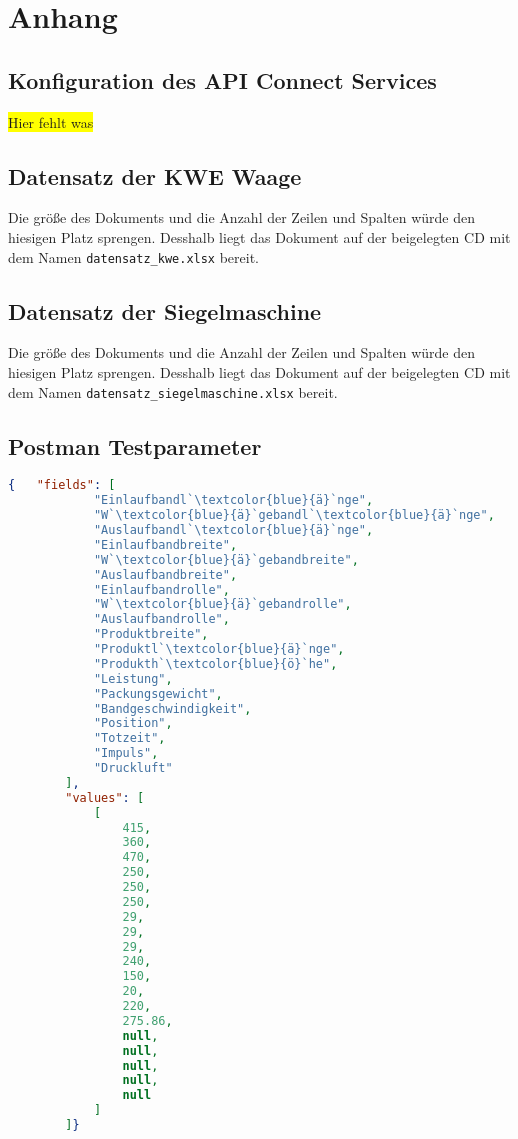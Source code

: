 \chapter{Anhang}
\label{ch:anhang}

\section{Konfiguration des API Connect Services}
\label{sec:konfigurationAPIConnect}
\colorbox{yellow}{Hier fehlt was}

\section{Datensatz der KWE Waage}
\label{sec:scaleData}
Die größe des Dokuments und die Anzahl der Zeilen und Spalten würde den hiesigen Platz sprengen. Desshalb liegt das
Dokument auf der beigelegten CD mit dem Namen \texttt{datensatz\_kwe.xlsx} bereit.

\section{Datensatz der Siegelmaschine}
\label{sec:hariboSiegel}
Die größe des Dokuments und die Anzahl der Zeilen und Spalten würde den hiesigen Platz sprengen. Desshalb liegt das
Dokument auf der beigelegten CD mit dem Namen \texttt{datensatz\_siegelmaschine.xlsx} bereit.

\newpage

\section{Postman Testparameter}
\label{sec:postmanTestparameter}

\begin{lstlisting}[language=JSON, caption=Testparameter für Postman, label=ls:anhang_postman, escapeinside=``]
    {   "fields": [
            "Einlaufbandl`\textcolor{blue}{ä}`nge",
            "W`\textcolor{blue}{ä}`gebandl`\textcolor{blue}{ä}`nge",
            "Auslaufbandl`\textcolor{blue}{ä}`nge",
            "Einlaufbandbreite",
            "W`\textcolor{blue}{ä}`gebandbreite",
            "Auslaufbandbreite",
            "Einlaufbandrolle",
            "W`\textcolor{blue}{ä}`gebandrolle",
            "Auslaufbandrolle",
            "Produktbreite",
            "Produktl`\textcolor{blue}{ä}`nge",
            "Produkth`\textcolor{blue}{ö}`he",
            "Leistung",
            "Packungsgewicht",
            "Bandgeschwindigkeit",
            "Position",
            "Totzeit",
            "Impuls",
            "Druckluft"
        ],
        "values": [
            [
                415,
                360,
                470,
                250,
                250,
                250,
                29,
                29,
                29,
                240,
                150,
                20,
                220,
                275.86,
                null,
                null,
                null,
                null,
                null
            ]
        ]}
\end{lstlisting}

